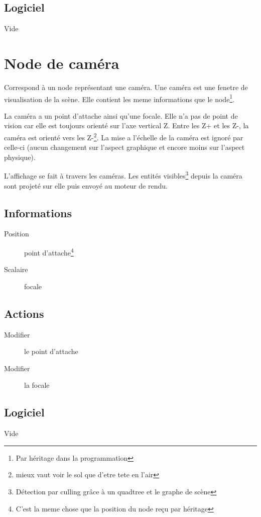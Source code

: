 \documentclass[11pt, a4paper]{article}
\begin{document}
\subsection{Logiciel}
Vide

\section{Node de caméra}
Correspond à un node représentant une caméra. Une caméra est une fenetre de visualisation de la scène. Elle contient les meme informations que le node\footnote{Par héritage dans la programmation}.

La caméra a un point d'attache ainsi qu'une focale. Elle n'a pas de point de vision car elle est toujours orienté sur l'axe vertical Z. Entre les Z+ et les Z-, la caméra est orienté vers les Z-\footnote{mieux vaut voir le sol que d'etre tete en l'air}.
La mise a l'échelle de la caméra est ignoré par celle-ci (aucun changement sur l'aspect graphique et encore moins sur l'aspect physique).

L'affichage se fait à travers les caméras. Les entités visibles\footnote{Détection par culling grâce à un quadtree et le graphe de scène} depuis la caméra sont projeté sur elle puis envoyé au moteur de rendu.

\subsection{Informations}
\begin{description}
\item[Position] point d'attache\footnote{C'est la meme chose que la position du node reçu par héritage}
\item[Scalaire] focale
\end{description}

\subsection{Actions}
\begin{description}
\item[Modifier] le point d'attache
\item[Modifier] la focale
\end{description}

\subsection{Logiciel}
Vide
\end{document}
